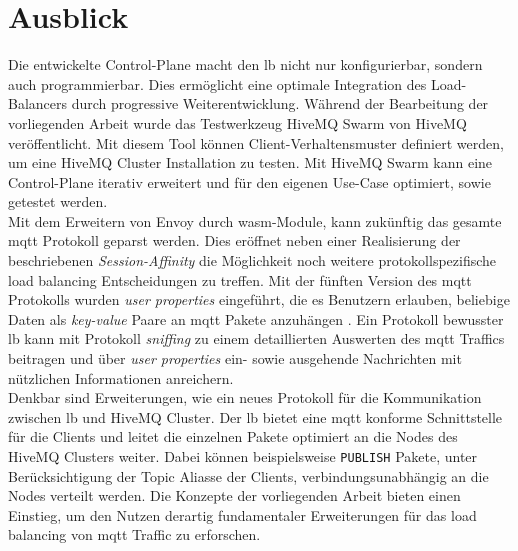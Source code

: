 \section{Ausblick}
Die entwickelte Control-Plane macht den \acl{lb} nicht nur konfigurierbar, sondern auch programmierbar. Dies ermöglicht eine optimale Integration des Load-Balancers durch progressive Weiterentwicklung.
Während der Bearbeitung der vorliegenden Arbeit wurde das Testwerkzeug HiveMQ Swarm \cite{teamHiveMQSwarmFind} von HiveMQ veröffentlicht. Mit diesem Tool können Client-Verhaltensmuster definiert werden, um eine HiveMQ Cluster Installation zu testen.
Mit HiveMQ Swarm kann eine Control-Plane iterativ erweitert und für den eigenen Use-Case optimiert, sowie getestet werden.
\\
Mit dem Erweitern von Envoy durch \acl{wasm}-Module, kann zukünftig das gesamte \ac{mqtt} Protokoll geparst werden.
Dies eröffnet neben einer Realisierung der beschriebenen \textit{Session-Affinity} die Möglichkeit noch weitere protokollspezifische load balancing Entscheidungen zu treffen.
Mit der fünften Version des \ac{mqtt} Protokolls wurden \textit{user properties} eingeführt, die es Benutzern erlauben, beliebige Daten als \textit{key-value} Paare an \ac{mqtt} Pakete anzuhängen \cite{raschbichlerMQTTHowNewa}.
Ein Protokoll bewusster \acl{lb} kann mit Protokoll \textit{sniffing} zu einem detaillierten Auswerten des \ac{mqtt} Traffics beitragen und über \textit{user properties} ein- sowie ausgehende Nachrichten mit nützlichen Informationen anreichern.
\\
Denkbar sind Erweiterungen, wie ein neues Protokoll für die Kommunikation zwischen \acl{lb} und HiveMQ Cluster.
Der \acl{lb} bietet eine \ac{mqtt} konforme Schnittstelle für die Clients und leitet die einzelnen Pakete optimiert an die Nodes des HiveMQ Clusters weiter.
Dabei können beispielsweise \verb|PUBLISH| Pakete, unter Berücksichtigung der Topic Aliasse der Clients, verbindungsunabhängig an die Nodes verteilt werden.
Die Konzepte der vorliegenden Arbeit bieten einen Einstieg, um den Nutzen derartig fundamentaler Erweiterungen für das load balancing von \ac{mqtt} Traffic zu erforschen.

